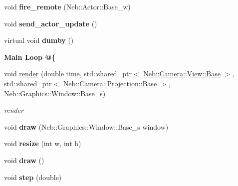 \begin{DoxyCompactItemize}
\item 
\hypertarget{classNeb_1_1Scene_1_1Base_ab000ef3d0fe819d74830cd1deaac9d67}{void {\bfseries fire\-\_\-remote} (Neb\-::\-Actor\-::\-Base\-\_\-w)}\label{classNeb_1_1Scene_1_1Base_ab000ef3d0fe819d74830cd1deaac9d67}

\item 
\hypertarget{classNeb_1_1Scene_1_1Base_a5525752576bf458b659eecb09be4250e}{void {\bfseries send\-\_\-actor\-\_\-update} ()}\label{classNeb_1_1Scene_1_1Base_a5525752576bf458b659eecb09be4250e}

\item 
\hypertarget{classNeb_1_1Scene_1_1Base_a508f9d9c313e3047c9bc0eaa06402620}{virtual void {\bfseries dumby} ()}\label{classNeb_1_1Scene_1_1Base_a508f9d9c313e3047c9bc0eaa06402620}

\end{DoxyCompactItemize}
\begin{Indent}{\bf Main Loop @\{}\par
\begin{DoxyCompactItemize}
\item 
\hypertarget{classNeb_1_1Scene_1_1Base_a27a040e9f1fc3b87ec6207f552d95286}{void \hyperlink{classNeb_1_1Scene_1_1Base_a27a040e9f1fc3b87ec6207f552d95286}{render} (double time, std\-::shared\-\_\-ptr$<$ \hyperlink{classNeb_1_1Camera_1_1View_1_1Base}{Neb\-::\-Camera\-::\-View\-::\-Base} $>$, std\-::shared\-\_\-ptr$<$ \hyperlink{classNeb_1_1Camera_1_1Projection_1_1Base}{Neb\-::\-Camera\-::\-Projection\-::\-Base} $>$, Neb\-::\-Graphics\-::\-Window\-::\-Base\-\_\-s)}\label{classNeb_1_1Scene_1_1Base_a27a040e9f1fc3b87ec6207f552d95286}

\begin{DoxyCompactList}\small\item\em render \end{DoxyCompactList}\item 
\hypertarget{classNeb_1_1Scene_1_1Base_aa4f3cc9f025a07f7f915a235185aaf27}{void {\bfseries draw} (Neb\-::\-Graphics\-::\-Window\-::\-Base\-\_\-s window)}\label{classNeb_1_1Scene_1_1Base_aa4f3cc9f025a07f7f915a235185aaf27}

\item 
\hypertarget{classNeb_1_1Scene_1_1Base_a9b1fbc5ffb04397abf8dc938544c5470}{void {\bfseries resize} (int w, int h)}\label{classNeb_1_1Scene_1_1Base_a9b1fbc5ffb04397abf8dc938544c5470}

\item 
\hypertarget{classNeb_1_1Scene_1_1Base_aa383aeca20d4ca9212ad5d88f82fe2e3}{void {\bfseries draw} ()}\label{classNeb_1_1Scene_1_1Base_aa383aeca20d4ca9212ad5d88f82fe2e3}

\item 
\hypertarget{classNeb_1_1Scene_1_1Base_afec6421ff59293e25f2428571cb60939}{void {\bfseries step} (double)}\label{classNeb_1_1Scene_1_1Base_afec6421ff59293e25f2428571cb60939}

\end{DoxyCompactItemize}
\end{Indent}
